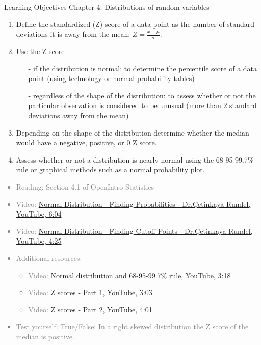 \documentclass[11pt]{article}
\newcommand{\gray}[1]{\textcolor{gray}{#1}}
\begin{document}
{\LARGE \textcolor{oiB}{Learning Objectives \hfill Chapter 4: Distributions of random variables}} \\

\begin{enumerate}
\renewcommand\labelenumi{\textcolor{oiB}{\textbf{LO \theenumi.}}}

\item Define the standardized (Z) score of a data point as the number of standard deviations it is away from the mean: $Z = \frac{x - \mu}{\sigma}$.

\item Use the Z score 
\begin{itemize}
\item[-] if the distribution is normal: to determine the percentile score of a data point (using technology or normal probability tables)
\item[-] regardless of the shape of the distribution: to assess whether or not the particular observation is considered to be unusual (more than 2 standard deviations away from the mean) 
\end{itemize}

\item Depending on the shape of the distribution determine whether the median would have a negative, positive, or 0 Z score.

\item Assess whether or not a distribution is nearly normal using the 68-95-99.7\% rule or graphical methods such as a normal probability plot.

\end{enumerate}

\gray{
{\it
\vspace{-0.75cm}
\begin{itemize}
\renewcommand{\labelitemi}{{\textcolor{oiB}{$\ast$}}}
\item Reading: Section 4.1 of OpenIntro Statistics
\item Video: \href{http://www.youtube.com/watch?v=ev463hHe544}{Normal Distribution - Finding Probabilities - Dr.\c{C}etinkaya-Rundel, YouTube, 6:04}
\item Video: \href{http://www.youtube.com/watch?v=6rAg4Y6NirU}{Normal Distribution - Finding Cutoff Points - Dr.\c{C}etinkaya-Rundel, YouTube, 4:25}
\item Additional resources:
\begin{itemize}
\item Video: \href{http://www.youtube.com/watch?v=McSFVzc8Swk&list=PL568547ACA9211CCA&index=24}{Normal distribution and 68-95-99.7\% rule, YouTube, 3:18}
\item Video: \href{http://www.youtube.com/watch?v=5v3Czc6ZK-Q&list=PL568547ACA9211CCA&index=23}{Z scores - Part 1, YouTube, 3:03} 
\item Video: \href{http://www.youtube.com/watch?v=aa_deKPDgI4&list=PL568547ACA9211CCA&index=22}{Z scores - Part 2, YouTube, 4:01}
\end{itemize}
\item Test yourself: True/False: In a right skewed distribution the Z score of the median is positive.
\end{itemize}
}}
\end{document}
